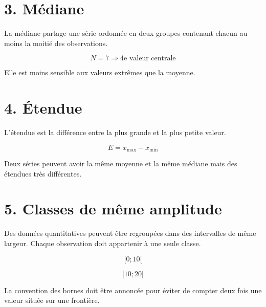 
\section{3. Médiane}
La médiane partage une série ordonnée en deux groupes contenant chacun au moins la moitié des observations.

\[
N=7\Rightarrow\text{4e valeur centrale}
\]

\begin{exemple}
Elle est moins sensible aux valeurs extrêmes que la moyenne.
\end{exemple}

\section{4. Étendue}
L’étendue est la différence entre la plus grande et la plus petite valeur.

\[
E=x_{\max}-x_{\min}
\]

\begin{exemple}
Deux séries peuvent avoir la même moyenne et la même médiane mais des étendues très différentes.
\end{exemple}

\section{5. Classes de même amplitude}
Des données quantitatives peuvent être regroupées dans des intervalles de même largeur. Chaque observation doit appartenir à une seule classe.

\[
[0;10[
\]

\[
[10;20[
\]

\begin{exemple}
La convention des bornes doit être annoncée pour éviter de compter deux fois une valeur située sur une frontière.
\end{exemple}



